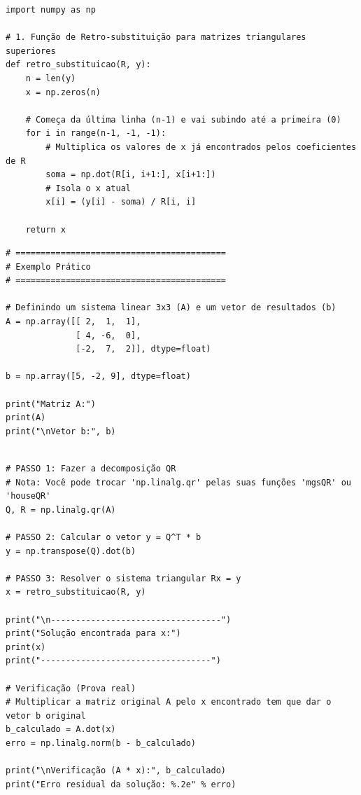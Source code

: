 \documentclass[../numerical_methods.tex]{subfiles}
\begin{document}
\begin{listing}[H]
	\caption{Retro-substituição em Python}
	\begin{verbatim}
import numpy as np

# 1. Função de Retro-substituição para matrizes triangulares superiores
def retro_substituicao(R, y):
    n = len(y)
    x = np.zeros(n)

    # Começa da última linha (n-1) e vai subindo até a primeira (0)
    for i in range(n-1, -1, -1):
        # Multiplica os valores de x já encontrados pelos coeficientes de R
        soma = np.dot(R[i, i+1:], x[i+1:])
        # Isola o x atual
        x[i] = (y[i] - soma) / R[i, i]

    return x
  \end{verbatim}
	\begin{verbatim}
# ==========================================
# Exemplo Prático
# ==========================================

# Definindo um sistema linear 3x3 (A) e um vetor de resultados (b)
A = np.array([[ 2,  1,  1],
              [ 4, -6,  0],
              [-2,  7,  2]], dtype=float)

b = np.array([5, -2, 9], dtype=float)

print("Matriz A:")
print(A)
print("\nVetor b:", b)
\end{verbatim}
\end{listing}
\begin{listing}[H]
	\begin{verbatim}

# PASSO 1: Fazer a decomposição QR
# Nota: Você pode trocar 'np.linalg.qr' pelas suas funções 'mgsQR' ou 'houseQR'
Q, R = np.linalg.qr(A)

# PASSO 2: Calcular o vetor y = Q^T * b
y = np.transpose(Q).dot(b)

# PASSO 3: Resolver o sistema triangular Rx = y
x = retro_substituicao(R, y)

print("\n----------------------------------")
print("Solução encontrada para x:")
print(x)
print("----------------------------------")

# Verificação (Prova real)
# Multiplicar a matriz original A pelo x encontrado tem que dar o vetor b original
b_calculado = A.dot(x)
erro = np.linalg.norm(b - b_calculado)

print("\nVerificação (A * x):", b_calculado)
print("Erro residual da solução: %.2e" % erro)
\end{verbatim}
\end{listing}
\end{document}
